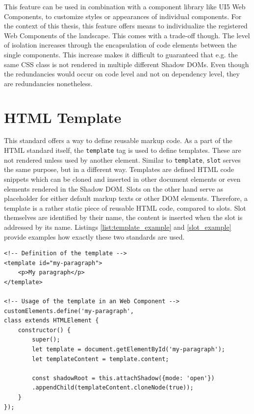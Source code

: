 This feature can be used in combination with a component library like UI5 Web Components, to customize styles or appearances of individual components. For the context of this thesis, this feature offers means to individualize the registered Web Components of the landscape. This comes with a trade-off though. The level of isolation increases through the encapsulation of code elements between the single components. This increase makes it difficult to guaranteed that e.g. the same CSS class is not rendered in multiple different Shadow DOMs. Even though the redundancies would occur on code level and not on dependency level, they are redundancies nonetheless.

\section{HTML Template}

This standard offers a way to define reusable markup code. As a part of the HTML standard itself, the \texttt{template} tag is used to define templates. These are not rendered unless used by another element. Similar to \texttt{template}, \texttt{slot} serves the same purpose, but in a different way. Templates are defined HTML code snippets which can be cloned and inserted in other document elements or even elements rendered in the Shadow DOM.
Slots on the other hand serve as placeholder for either default markup texts or other DOM elements. Therefore, a template is a rather static piece of reusable HTML code, compared to slots.
Slot themselves are identified by their name, the content is inserted when the slot is addressed by its name.
Listings \ref{list:template_example} and \ref{slot_example} provide examples how exactly these two standards are used. \cite{wc_html_template_slots}

\begin{lstlisting}[caption=Definition and usage of the \texttt{template} standard \cite{wc_html_template_slots}, label=list:template_example,  xleftmargin=.01\textwidth, xrightmargin=.01\textwidth]
<!-- Definition of the template -->
<template id="my-paragraph">
	<p>My paragraph</p>
</template>

<!-- Usage of the template in an Web Component -->
customElements.define('my-paragraph',
class extends HTMLElement {
	constructor() {
		super();
		let template = document.getElementById('my-paragraph');
		let templateContent = template.content;
		
		const shadowRoot = this.attachShadow({mode: 'open'})
		.appendChild(templateContent.cloneNode(true));
	}
});
\end{lstlisting}


